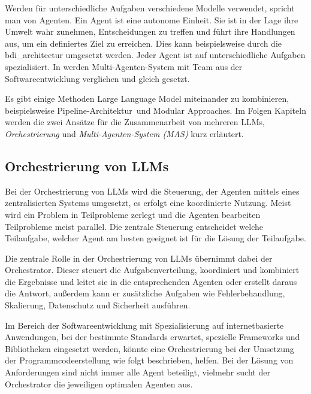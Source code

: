 Werden für unterschiedliche Aufgaben verschiedene Modelle verwendet, spricht man von Agenten. Ein Agent ist eine autonome Einheit. Sie ist in der Lage ihre Umwelt wahr zunehmen, Entscheidungen zu treffen und führt ihre Handlungen aus, um ein definiertes Ziel zu erreichen. Dies kann beispielsweise durch die \gls{bdi_architectur} umgesetzt werden. Jeder Agent ist auf unterschiedliche Aufgaben spezialisiert. In \cite{du-2024} werden Multi-Agenten-System mit Team aus der Softwareentwicklung verglichen und gleich gesetzt.\vspace{0.2cm}

Es gibt einige Methoden Large Language Model miteinander zu kombinieren, beispielsweise \glqq Pipeline-Architektur\grqq \ und \glqq Modular Approaches\grqq . Im Folgen Kapiteln werden die zwei Ansätze für die Zusammenarbeit von mehreren LLMs, \textit{Orchestrierung} und \textit{Multi-Agenten-System (MAS)} kurz erläutert.

\subsection{Orchestrierung von LLMs}
Bei der Orchestrierung von LLMs wird die Steuerung, der Agenten mittels eines zentralisierten Systems umgesetzt, es erfolgt eine koordinierte Nutzung. Meist wird ein Problem in Teilprobleme zerlegt und die Agenten bearbeiten Teilprobleme meist parallel. Die zentrale Steuerung entscheidet welche Teilaufgabe, welcher Agent am besten geeignet ist für die Lösung der Teilaufgabe.\vspace{0.2cm}

Die zentrale Rolle in der Orchestrierung von LLMs übernimmt dabei der Orchestrator. Dieser steuert die Aufgabenverteilung, koordiniert und kombiniert die Ergebnisse und leitet sie in die entsprechenden Agenten oder erstellt daraus die Antwort, außerdem kann er zusätzliche Aufgaben wie Fehlerbehandlung, Skalierung, Datenschutz und Sicherheit ausführen.\vspace{0.2cm}

Im Bereich der Softwareentwicklung mit Spezialisierung auf internetbasierte Anwendungen, bei der bestimmte Standards erwartet, spezielle Frameworks und Bibliotheken eingesetzt werden, könnte eine Orchestrierung bei der Umsetzung der Programmcodeerstellung wie folgt beschrieben, helfen. Bei der Lösung von Anforderungen sind nicht immer alle Agent beteiligt, vielmehr sucht der Orchestrator die jeweiligen optimalen Agenten aus.\vspace{0.2cm}

